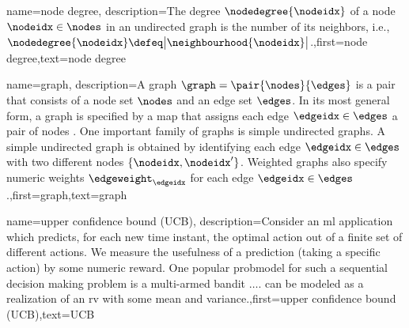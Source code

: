 {{
{name={node degree},
	description={The degree $\nodedegree{\nodeidx}$ of a node $\nodeidx \in \nodes$ 
		in an undirected \gls{graph} is the number of its \gls{neighbors}, i.e., $\nodedegree{\nodeidx} \defeq \big|\neighbourhood{\nodeidx}\big|$.},first={node degree},text={node degree} 
}

{name={graph},
	description={A graph $\graph = \pair{\nodes}{\edges}$ is a pair that consists of 
		a node set $\nodes$ and an edge set $\edges$. In its most general form, a graph is 
		specified by a map that assigns each edge $\edgeidx \in \edges$ a pair of nodes \cite{RockNetworks}. 
		One important family of graphs is simple undirected graphs. A simple undirected graph 
		is obtained by identifying each edge $\edgeidx \in \edges$ with two different nodes $\{\nodeidx,\nodeidx'\}$. 
		Weighted graphs also specify numeric \gls{weights} $\edgeweight_{\edgeidx}$ for each 
		edge $\edgeidx \in \edges$.},first={graph},text={graph} 
}


{name={upper confidence bound (UCB)},
	description={Consider an \gls{ml} 
		application which predicts, for each new time instant,
		 the optimal action out of a finite set of different actions. We measure the usefulness 
		 of a \gls{prediction} (taking a specific action) by some numeric \gls{reward}. 
		 One popular \gls{probmodel} for such a sequential decision making problem 
		 is a multi-armed bandit $\ldots$. can be modeled as a \gls{realization} of an \gls{rv} 
		 with some \gls{mean} and \gls{variance}.},first={upper confidence bound (UCB)},text={UCB} 
}


}}
